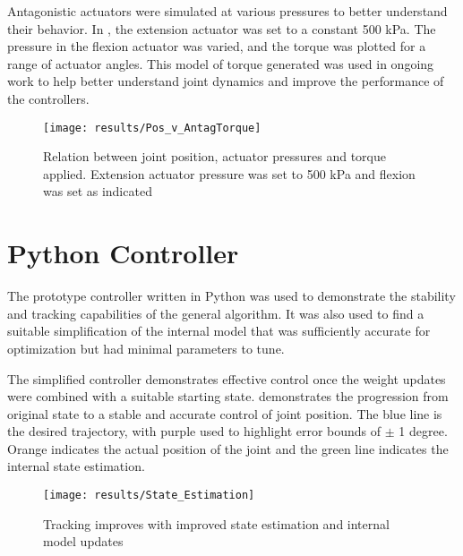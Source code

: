 
Antagonistic actuators were simulated at various pressures to better understand
their behavior. In , the extension
actuator was set to a constant 500 kPa. The pressure in the flexion actuator was
varied, and the torque was plotted for a range of actuator angles. This model of
torque generated was used in ongoing work to help better understand joint
dynamics and improve the performance of the controllers.

\begin{figure}
\centering
\texttt{[image: results/Pos\_v\_AntagTorque]}
\caption{Relation between joint position, actuator pressures and
torque applied. Extension actuator pressure was set to 500 kPa and flexion was
set as indicated}
\label{fig:AntagonisticPressureTorque}
\end{figure}

\section{Python Controller}

The prototype controller written in Python was used to demonstrate the stability
and tracking capabilities of the general algorithm. It was also used to find a
suitable simplification of the internal model that was sufficiently accurate for
optimization but had minimal parameters to tune.



The simplified controller demonstrates effective control once the weight updates
were combined with a suitable starting state. 
demonstrates the progression from original state to a stable and accurate
control of joint position. The blue line is the desired trajectory, with purple
used to highlight error bounds of $\pm$ 1 degree. Orange indicates the actual
position of the joint and the green line indicates the internal state
estimation.

\begin{figure}
\centering
\texttt{[image: results/State\_Estimation]}
\caption{Tracking improves with improved state estimation and internal model
updates}
\label{fig:SimplifiedTracking}
\end{figure}

